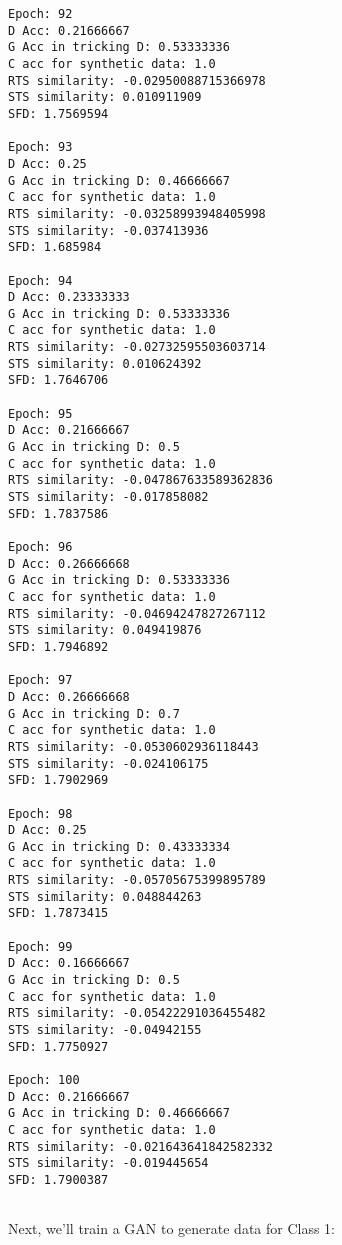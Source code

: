 \documentclass[11pt]{article}
\begin{document}
\begin{Verbatim}[commandchars=\\\{\}]
Epoch: 92
D Acc: 0.21666667
G Acc in tricking D: 0.53333336
C acc for synthetic data: 1.0
RTS similarity: -0.02950088715366978
STS similarity: 0.010911909
SFD: 1.7569594

Epoch: 93
D Acc: 0.25
G Acc in tricking D: 0.46666667
C acc for synthetic data: 1.0
RTS similarity: -0.03258993948405998
STS similarity: -0.037413936
SFD: 1.685984

Epoch: 94
D Acc: 0.23333333
G Acc in tricking D: 0.53333336
C acc for synthetic data: 1.0
RTS similarity: -0.02732595503603714
STS similarity: 0.010624392
SFD: 1.7646706

Epoch: 95
D Acc: 0.21666667
G Acc in tricking D: 0.5
C acc for synthetic data: 1.0
RTS similarity: -0.047867633589362836
STS similarity: -0.017858082
SFD: 1.7837586

Epoch: 96
D Acc: 0.26666668
G Acc in tricking D: 0.53333336
C acc for synthetic data: 1.0
RTS similarity: -0.04694247827267112
STS similarity: 0.049419876
SFD: 1.7946892

Epoch: 97
D Acc: 0.26666668
G Acc in tricking D: 0.7
C acc for synthetic data: 1.0
RTS similarity: -0.0530602936118443
STS similarity: -0.024106175
SFD: 1.7902969

Epoch: 98
D Acc: 0.25
G Acc in tricking D: 0.43333334
C acc for synthetic data: 1.0
RTS similarity: -0.05705675399895789
STS similarity: 0.048844263
SFD: 1.7873415

Epoch: 99
D Acc: 0.16666667
G Acc in tricking D: 0.5
C acc for synthetic data: 1.0
RTS similarity: -0.05422291036455482
STS similarity: -0.04942155
SFD: 1.7750927

Epoch: 100
D Acc: 0.21666667
G Acc in tricking D: 0.46666667
C acc for synthetic data: 1.0
RTS similarity: -0.021643641842582332
STS similarity: -0.019445654
SFD: 1.7900387


    \end{Verbatim}

    Next, we'll train a GAN to generate data for Class 1:
\end{document}

